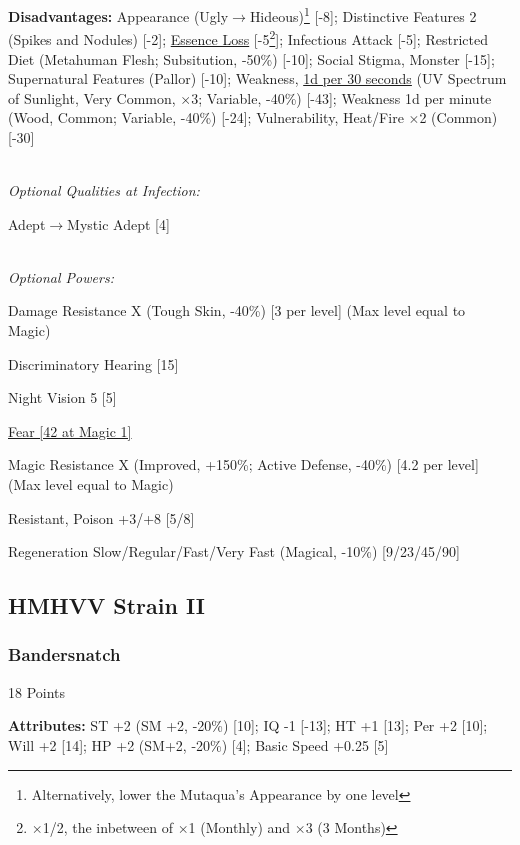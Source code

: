 \begin{multicols*}{3}
	\textbf{Disadvantages:}	
	Appearance (Ugly$\rightarrow$Hideous)\footnote{Alternatively, lower the Mutaqua's Appearance by one level} [-8]; Distinctive Features 2 (Spikes and Nodules) [-2]; \hyperref[essence_loss]{Essence Loss} [-5\footnote{$\times$1/2, the inbetween of $\times$1 (Monthly) and $\times$3 (3 Months)}]; Infectious Attack [-5]; Restricted Diet (Metahuman Flesh; Subsitution, -50\%) [-10]; Social Stigma, Monster [-15]; Supernatural Features (Pallor) [-10]; Weakness, \textcolor{Blue}{\href{http://forums.sjgames.com/showpost.php?p=149688&postcount=7}{1d per 30 seconds}} (UV Spectrum of Sunlight, Very Common, $\times$3; Variable, -40\%) [-43]; Weakness 1d per minute (Wood, Common; Variable, -40\%) [-24]; Vulnerability, Heat/Fire $\times$2 (Common) [-30]
	
	\textit{\\Optional Qualities at Infection:}
	
	Adept$\rightarrow$Mystic Adept [4]
	
	\textit{\\Optional Powers:}
		
	Damage Resistance X (Tough Skin, -40\%) [3 per level] (Max level equal to Magic)
		
	Discriminatory Hearing [15]

	Night Vision 5 [5]
	
	\hyperref[fear]{Fear [42 at Magic 1]}
	
	Magic Resistance X (Improved, +150\%; Active Defense, -40\%) [4.2 per level] (Max level equal to Magic)
	
	Resistant, Poison +3/+8 [5/8]
	
	Regeneration Slow/Regular/Fast/Very Fast (Magical, -10\%) [9/23/45/90]	
	
	\subsection*{HMHVV Strain II}
		
	\subsubsection{Bandersnatch}\label{bandersnatch}
	\begin{flushright}
		18 Points
	\end{flushright}

	\textbf{Attributes:}
	ST +2 (SM +2, -20\%) [10]; IQ -1 [-13]; HT +1 [13]; Per +2 [10]; Will +2 [14]; HP +2 (SM+2, -20\%) [4]; Basic Speed  +0.25 [5]
	

\end{multicols*}

